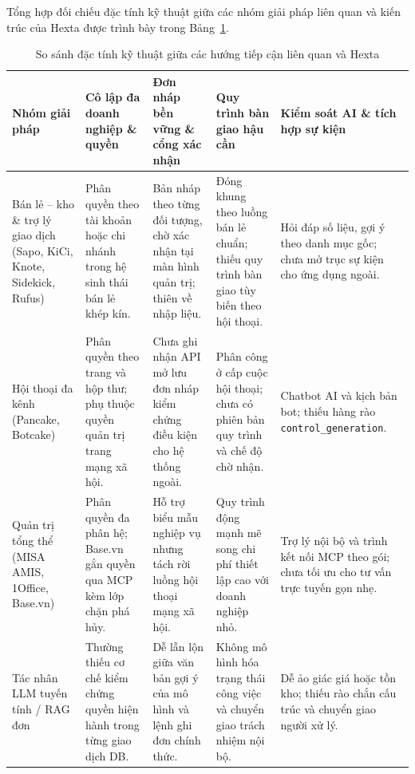 Tổng hợp đối chiếu đặc tính kỹ thuật giữa các nhóm giải pháp liên quan và kiến trúc của Hexta được trình bày trong Bảng~\ref{tab:related-solutions-tech}.

\begin{table}[htbp]
  \centering
  \small
  \setlength{\tabcolsep}{3.5pt}
  \renewcommand{\arraystretch}{1.2}
  \caption{So sánh đặc tính kỹ thuật giữa các hướng tiếp cận liên quan và Hexta}\label{tab:related-solutions-tech}
  \begin{tabularx}{\linewidth}{@{}
    >{\raggedright\arraybackslash}p{2.65cm}
    >{\raggedright\arraybackslash}X
    >{\raggedright\arraybackslash}X
    >{\raggedright\arraybackslash}X
    >{\raggedright\arraybackslash}X@{}}
    \toprule
    Nhóm giải pháp & Cô lập đa doanh nghiệp \& quyền & Đơn nháp bền vững \& cổng xác nhận & Quy trình bàn giao hậu cần & Kiểm soát AI \& tích hợp sự kiện \\
    \midrule
    Bán lẻ -- kho \& trợ lý giao dịch (Sapo, KiCi, Knote, Sidekick, Rufus) &
    Phân quyền theo tài khoản hoặc chi nhánh trong hệ sinh thái bán lẻ khép kín. &
    Bản nháp theo từng đối tượng, chờ xác nhận tại màn hình quản trị; thiên về nhập liệu. &
    Đóng khung theo luồng bán lẻ chuẩn; thiếu quy trình bàn giao tùy biến theo hội thoại. &
    Hỏi đáp số liệu, gợi ý theo danh mục gốc; chưa mở trục sự kiện cho ứng dụng ngoài. \\
    Hội thoại đa kênh (Pancake, Botcake) &
    Phân quyền theo trang và hộp thư; phụ thuộc quyền quản trị trang mạng xã hội. &
    Chưa ghi nhận API mở lưu đơn nháp kiểm chứng điều kiện cho hệ thống ngoài. &
    Phân công ở cấp cuộc hội thoại; chưa có phiên bản quy trình và chế độ chờ nhận. &
    Chatbot AI và kịch bản bot; thiếu hàng rào \texttt{control\_\hspace{0pt}generation}. \\
    Quản trị tổng thể (MISA AMIS, 1Office, Base.vn) &
    Phân quyền đa phân hệ; Base.vn gắn quyền qua MCP kèm lớp chặn phá hủy. &
    Hỗ trợ biểu mẫu nghiệp vụ nhưng tách rời luồng hội thoại mạng xã hội. &
    Quy trình động mạnh mẽ song chi phí thiết lập cao với doanh nghiệp nhỏ. &
    Trợ lý nội bộ và trình kết nối MCP theo gói; chưa tối ưu cho tư vấn trực tuyến gọn nhẹ. \\
    Tác nhân LLM tuyến tính / RAG đơn &
    Thường thiếu cơ chế kiểm chứng quyền hiện hành trong từng giao dịch DB. &
    Dễ lẫn lộn giữa văn bản gợi ý của mô hình và lệnh ghi đơn chính thức. &
    Không mô hình hóa trạng thái công việc và chuyển giao trách nhiệm nội bộ. &
    Dễ ảo giác giá hoặc tồn kho; thiếu rào chắn cấu trúc và chuyển giao người xử lý. \\

\end{tabularx}
\end{table}
